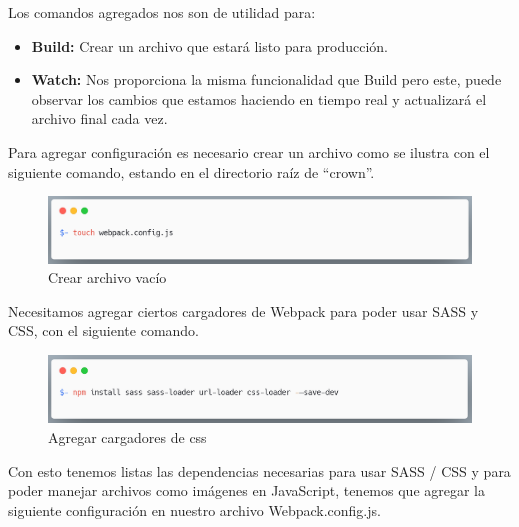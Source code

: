     \newline
    \newline
    Los comandos agregados nos son de utilidad para:
    \begin{itemize}
    \item \textbf{Build:} Crear un archivo que estará listo para producción.
    \item \textbf{Watch:} Nos proporciona la misma funcionalidad que Build pero este, puede observar los cambios que estamos haciendo en tiempo real y actualizará el archivo final cada vez.
    \end{itemize}
    Para agregar configuración es necesario crear un archivo como se ilustra con el siguiente comando, estando en el directorio raíz de “crown”.
    \newline
    \newline
     \begin{figure}[H]
    \includegraphics[width=1\textwidth]{./Imagenes/image38.png}
     \caption[Crear archivo vacío]{Crear archivo vacío}
         \end{figure}
    \newline
    Necesitamos agregar ciertos cargadores de Webpack para poder usar SASS y CSS, con el siguiente comando.
    \newline
    \newline
     \begin{figure}[H]
    \includegraphics[width=1\textwidth]{./Imagenes/image8.png}
     \caption[Agregar cargadores de css]{Agregar cargadores de css}
         \end{figure}
    \newline
    \newline
    Con esto tenemos listas las dependencias necesarias para usar SASS / CSS y para poder manejar archivos como imágenes en JavaScript, tenemos que agregar la siguiente configuración en nuestro archivo Webpack.config.js.
    \newline
    \newline
